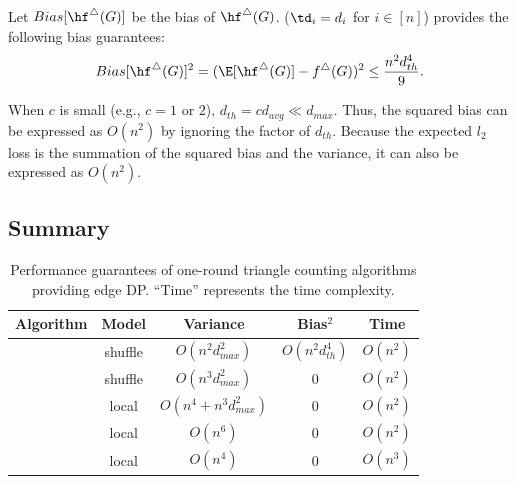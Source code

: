 \begin{theorem}
\label{chap3-thm:bias_II_ast}
Let $Bias[\hf^\triangle(G)]$ be the bias of $\hf^\triangle(G)$. 
\AlgWSTriVR{} ($\td_i = d_i$ for $i\in[n]$) 
provides the following bias guarantees:
\begin{align}
    Bias[\hf^\triangle(G)]^2 
    = (\E[\hf^\triangle(G)] - f^\triangle(G))^2 
    \leq \frac{n^2 d_{th}^4}{9}. 
    \label{chap3-eq:thm:bias_II_ast}
\end{align}
\end{theorem}

When $c$ is small (e.g., $c=1$ or $2$), $d_{th} = c d_{avg} \ll d_{max}$. 
Thus, the squared bias can be expressed as $O(n^2)$ by ignoring the factor of $d_{th}$. 
Because the expected $l_2$ loss is the summation of the squared bias and the variance, it can also be expressed as $O(n^2)$. 

\subsection{Summary}
\label{chap3-sub:summary}


\begin{table}[t]
  \centering
  \begin{tabular}{|l|c|c|c|c|}
    \hline
    Algorithm & Model & Variance & Bias$^2$ & Time \\ \hline
    \AlgWSTriVR{} & shuffle & $O(n^2 d_{max}^2)$ & $O(n^2 d_{th}^4)$ & $O(n^2)$ \\ \hline
    \AlgWSTri{} & shuffle & $O(n^3 d_{max}^2)$ & $0$ & $O(n^2)$ \\ \hline
    \AlgWLTri{} & local & $O(n^4 + n^3 d_{max}^2)$ & $0$ & $O(n^2)$ \\ \hline
    \AlgARRTri{} \cite{Imola_USENIX22} & local & $O(n^6)$ & $0$ & $O(n^2)$ \\ \hline
    \AlgRRTri{} \cite{Imola_USENIX21} & local & $O(n^4)$ & $0$ & $O(n^3)$ \\ \hline
  \end{tabular}
  \caption{Performance guarantees 
  of one-round triangle counting algorithms providing edge DP. 
  ``Time'' represents the time complexity. 
  }
  \label{chap3-tab:upper_bounds_triangle}
\end{table}

